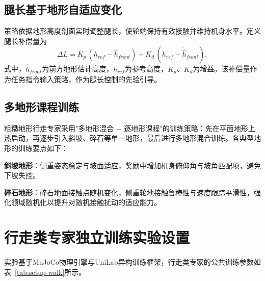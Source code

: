 \subsection{腿长基于地形自适应变化}

策略依据地形高度剖面实时调整腿长，使轮端保持有效接触并维持机身水平。定义腿长补偿量为
\begin{equation}
  \Delta L = K_p\,(h_{ref} - \hat{h}_{front}) + K_d\,(\dot{h}_{ref} - \dot{\hat{h}}_{front}),
  \label{eq:leg-adapt}
\end{equation}
式中，$\hat{h}_{front}$为前方地形估计高度，$h_{ref}$为参考高度，$K_p$、$K_d$为增益。该补偿量作为任务指令输入策略，作为腿长控制的先验引导。

\subsection{多地形课程训练}

粗糙地形行走专家采用"多地形混合 + 逐地形课程"的训练策略：先在平面地形上热启动，再逐步引入斜坡、碎石等单一地形，最后进行多地形混合训练。各典型地形的训练要点如下：

\textbf{斜坡地形}：侧重姿态稳定与坡面适应，奖励中增加机身俯仰角与坡角匹配项，避免下坡失控。

\textbf{碎石地形}：碎石地面接触点随机变化，侧重轮地接触鲁棒性与速度跟踪平滑性，强化领域随机化以提升对随机接触扰动的适应能力。

\section{行走类专家独立训练实验设置}

实验基于MuJoCo物理引擎与UniLab异构训练框架，行走类专家的公共训练参数如表~\ref{tab:setup-walk}所示。

\begin{table}[!htbp]
    \centering
    \label{tab:setup-walk}
\end{table}

